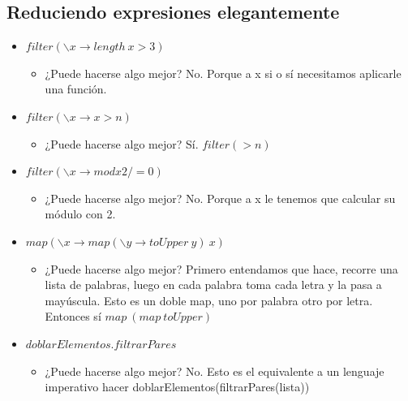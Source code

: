 \documentclass[10pt,a4paper]{article}
\begin{document}
\subsection*{Reduciendo expresiones elegantemente}
\begin{itemize}
    \item $filter(\backslash x \rightarrow length \ x > 3)$
    \begin{itemize}
        \item  ¿Puede hacerse algo mejor? No. Porque a x si o sí necesitamos aplicarle una función.
    \end{itemize}
    \item $filter(\backslash x \rightarrow x > n)$
    \begin{itemize}
        \item ¿Puede hacerse algo mejor? Sí. $filter (>n)$
    \end{itemize}
    \item $filter (\backslash x \rightarrow mod x 2 /= 0)$
    \begin{itemize}
        \item ¿Puede hacerse algo mejor? No. Porque a x le tenemos que calcular su módulo con 2.
    \end{itemize}
    \item $map(\backslash x \rightarrow map (\backslash y \rightarrow toUpper \ y) \ x)$
    \begin{itemize}
        \item ¿Puede hacerse algo mejor? Primero entendamos que hace, recorre una lista de palabras, luego en cada palabra toma cada letra y la pasa a mayúscula. Esto es un doble map, uno por palabra otro por letra. Entonces sí $map \ (map \ toUpper)$
    \end{itemize}
    \item $doblarElementos . filtrarPares$
    \begin{itemize}
        \item ¿Puede hacerse algo mejor? No. Esto es el equivalente a un lenguaje imperativo hacer doblarElementos(filtrarPares(lista))
    \end{itemize}

\end{itemize}
\end{document}
